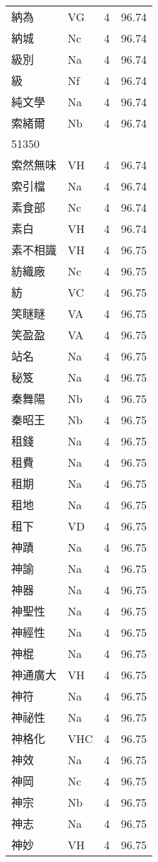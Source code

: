 \documentclass[twocolumn]{book}
\begin{document}
\begin{supertabular}{llrr}
納為 & VG & 4 &  96.74\\
納城 & Nc & 4 &  96.74\\
級別 & Na & 4 &  96.74\\
級 & Nf & 4 &  96.74\\
純文學 & Na & 4 &  96.74\\
索緒爾 & Nb & 4 &  96.74\\
51350\\
索然無味 & VH & 4 &  96.74\\
索引檔 & Na & 4 &  96.74\\
素食部 & Nc & 4 &  96.74\\
素白 & VH & 4 &  96.74\\
素不相識 & VH & 4 &  96.75\\
紡織廠 & Nc & 4 &  96.75\\
紡 & VC & 4 &  96.75\\
笑瞇瞇 & VA & 4 &  96.75\\
笑盈盈 & VA & 4 &  96.75\\
站名 & Na & 4 &  96.75\\
秘笈 & Na & 4 &  96.75\\
秦舞陽 & Nb & 4 &  96.75\\
秦昭王 & Nb & 4 &  96.75\\
租錢 & Na & 4 &  96.75\\
租費 & Na & 4 &  96.75\\
租期 & Na & 4 &  96.75\\
租地 & Na & 4 &  96.75\\
租下 & VD & 4 &  96.75\\
神蹟 & Na & 4 &  96.75\\
神諭 & Na & 4 &  96.75\\
神器 & Na & 4 &  96.75\\
神聖性 & Na & 4 &  96.75\\
神經性 & Na & 4 &  96.75\\
神棍 & Na & 4 &  96.75\\
神通廣大 & VH & 4 &  96.75\\
神符 & Na & 4 &  96.75\\
神祕性 & Na & 4 &  96.75\\
神格化 & VHC & 4 &  96.75\\
神效 & Na & 4 &  96.75\\
神岡 & Nc & 4 &  96.75\\
神宗 & Nb & 4 &  96.75\\
神志 & Na & 4 &  96.75\\
神妙 & VH & 4 &  96.75\\

\end{supertabular}
\end{document}

